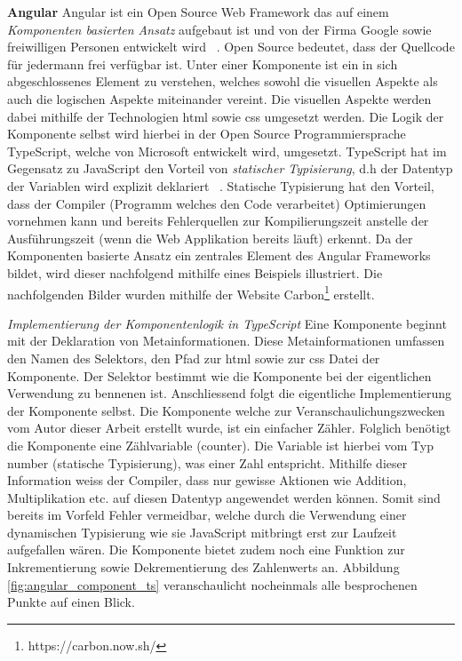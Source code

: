 \textbf{Angular}
\newline
Angular ist ein Open Source Web Framework das auf einem \textit{Komponenten basierten Ansatz} aufgebaut ist und von der Firma Google sowie freiwilligen Personen entwickelt wird ~\citep{what_is_angular}. Open Source bedeutet, dass der Quellcode für jedermann frei verfügbar ist. Unter einer Komponente ist ein in sich abgeschlossenes Element zu verstehen, welches sowohl die visuellen Aspekte als auch die logischen Aspekte miteinander vereint. Die visuellen Aspekte werden dabei mithilfe der Technologien \gls{html} sowie \gls{css} umgesetzt werden. Die Logik der Komponente selbst wird hierbei in der Open Source Programmiersprache TypeScript, welche von Microsoft entwickelt wird, umgesetzt. TypeScript hat im Gegensatz zu JavaScript den Vorteil von \textit{statischer Typisierung}, d.h der Datentyp der Variablen wird explizit deklariert ~\citep{typescript}. Statische Typisierung hat den Vorteil, dass der Compiler (Programm welches den Code verarbeitet) Optimierungen vornehmen kann und bereits Fehlerquellen zur Kompilierungszeit anstelle der Ausführungszeit (wenn die Web Applikation bereits läuft) erkennt. Da der Komponenten basierte Ansatz ein zentrales Element des Angular Frameworks bildet, wird dieser nachfolgend mithilfe eines Beispiels illustriert. Die nachfolgenden Bilder wurden mithilfe der Website Carbon\footnote{https://carbon.now.sh/} erstellt.

\clearpage
\textit{Implementierung der Komponentenlogik in TypeScript}
\newline
Eine Komponente beginnt mit der Deklaration von Metainformationen. Diese Metainformationen umfassen den Namen des Selektors, den Pfad zur \gls{html} sowie zur \gls{css} Datei der Komponente. Der Selektor bestimmt wie die Komponente bei der eigentlichen Verwendung zu bennenen ist. Anschliessend folgt die eigentliche Implementierung der Komponente selbst. Die Komponente welche zur Veranschaulichungszwecken vom Autor dieser Arbeit erstellt wurde, ist ein einfacher Zähler. Folglich benötigt die Komponente eine Zählvariable (counter). Die Variable ist hierbei vom Typ number (statische Typisierung), was einer Zahl entspricht. Mithilfe dieser Information weiss der Compiler, dass nur gewisse Aktionen wie Addition, Multiplikation etc. auf diesen Datentyp angewendet werden können. Somit sind bereits im Vorfeld Fehler vermeidbar, welche durch die Verwendung einer dynamischen Typisierung wie sie JavaScript mitbringt erst zur Laufzeit aufgefallen wären. Die Komponente bietet zudem noch eine Funktion zur Inkrementierung sowie Dekrementierung des Zahlenwerts an. Abbildung \ref{fig:angular_component_ts} veranschaulicht nocheinmals alle besprochenen Punkte auf einen Blick.

